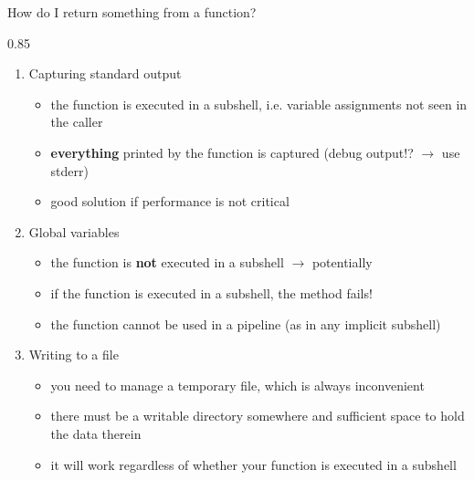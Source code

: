\begin{frame}[fragile]{How do I return something from a function?}
    \begin{overlayarea}{\textwidth}{0.85\textheight}
        \begin{enumerate}
            \item<only@3-> Capturing standard output
                           \begin{itemize}[<only@{3,7}>]
                               \item[\crossmark] the function is executed in a subshell, i.e. variable assignments not seen in the caller
                               \item[\crossmark] \textbf{everything} printed by the function is captured (debug output!? $\to$ use stderr)
                               \item[\checkmark] good solution if performance is not critical
                           \end{itemize}
            \item<only@4-> Global variables
                           \begin{itemize}[<only@{4,7}>]
                               \item[\checkmark] the function is \textbf{not} executed in a subshell $\to$ potentially 
                               \item[\crossmark] if the function is executed in a subshell, the method fails! 
                               \item[\crossmark] the function cannot be used in a pipeline (as in any implicit subshell)
                           \end{itemize}
            \item<only@5-> Writing to a file
                           \begin{itemize}[<only@{5,7}>]
                               \item[\crossmark] you need to manage a temporary file, which is always inconvenient
                               \item[\crossmark] there must be a writable directory somewhere and sufficient space to hold the data therein
                               \item[\checkmark] it will work regardless of whether your function is executed in a subshell

\end{itemize}
\end{enumerate}
\end{overlayarea}
\end{frame}

